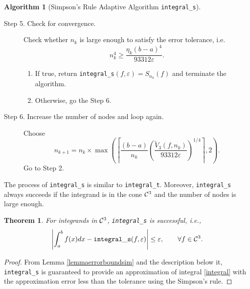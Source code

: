 \documentclass{iitthesis}
\newtheorem{theorem}{Theorem}
\theoremstyle{definition}
\newtheorem{algo}{Algorithm}
\theoremstyle{remark}
\begin{document}
\begin{algo} [Simpson's Rule Adaptive Algorithm {\tt integral\_s}]
\begin{description}
\item[Step 5. Check for convergence.] Check whether $n_k$ is large enough to satisfy the error tolerance, i.e.
    \begin{equation*}
          n_k^4 \ge \frac{\eta_{k}(b-a)^4}{93312\varepsilon}.
    \end{equation*}

    \begin{enumerate}[label=\alph*)]
      \item If true, return {\tt integral\_s}$(f,\varepsilon)=S_{n_k}(f)$ and terminate the algorithm.
      \item Otherwise, go the Step 6.
    \end{enumerate}


\item[Step 6. Increase the number of nodes and loop again.] Choose
$$
n_{k+1}=n_k\times\max\left(\left\lceil\frac{(b-a)}{n_{k}}\left(\frac{\widetilde{V}_3(f,n_k)}{93312\varepsilon}\right)^{1/4}\right\rceil,2\right).
$$
Go to Step 2.
\end{description}
\end{algo}

The process of {\tt integral\_s} is similar to {\tt integral\_t}. Moreover, {\tt integral\_s} always succeeds if the integrand is in the cone $\mathcal{C}^3$ and the number of nodes is large enough.
\begin{theorem}\label{thmSimpson}
    For integrands in $\mathcal{C}^3$, {\tt integral\_s} is successful, i.e.,
    \begin{equation*}
      \left|\int_{a}^{b}f(x)dx-{\tt integral\_s}(f,\varepsilon)\right|\le\varepsilon, \qquad \forall f\in \mathcal{C}^3.
    \end{equation*}
\end{theorem}
\begin{proof}
 From Lemma \ref{lemmaerrorboundsim} and the description below it, {\tt integral\_s} is guaranteed to provide an approximation of integral \eqref{integral} with the approximation error less than the tolerance using the Simpson's rule.
\end{proof}
\end{document}
